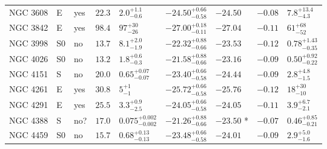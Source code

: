 \begin{table*}
\begin{center}
\begin{tabular}{lllllllll}
NGC 3608  &  E  &  yes   &  $22.3$  &  $2.0_{-0.6}^{+1.1}$   &  $-24.50_{-0.58}^{+0.66}$   &  $-24.50$   &  $-0.08$  &  $7.8_{-4.3}^{+13.4}$   \\ 
NGC 3842  &  E  &  yes   &  $98.4$  &  $97_{-26}^{+30}$   &  $-27.00_{-0.11}^{+0.18}$   &  $-27.04$   &  $-0.11$  &  $61_{-52}^{+68}$   \\ 
NGC 3998  &  S0  &  no   &  $13.7$  &  $8.1_{-1.9}^{+2.0}$   &  $-22.32_{-0.66}^{+0.88}$   &  $-23.53$   &  $-0.12$  &  $0.78_{-0.35}^{+1.43}$   \\ 
NGC 4026  &  S0  &  no   &  $13.2$  &  $1.8_{-0.3}^{+0.6}$   &  $-21.58_{-0.66}^{+0.88}$   &  $-23.16$   &  $-0.09$  &  $0.50_{-0.22}^{+0.92}$   \\ 
NGC 4151  &  S  &  no   &  $20.0$  &  $0.65_{-0.07}^{+0.07}$   &  $-23.40_{-0.58}^{+0.66}$   &  $-24.44$   &  $-0.09$  &  $2.8_{-1.5}^{+4.8}$   \\ 
NGC 4261  &  E  &  yes   &  $30.8$  &  $5_{-1}^{+1}$   &  $-25.72_{-0.58}^{+0.66}$   &  $-25.76$   &  $-0.12$  &  $18_{-10}^{+30}$   \\ 
NGC 4291  &  E  &  yes   &  $25.5$  &  $3.3_{-2.5}^{+0.9}$   &  $-24.05_{-0.58}^{+0.66}$   &  $-24.05$   &  $-0.11$  &  $3.9_{-2.1}^{+6.7}$   \\ 
NGC 4388  &  S  &  no?  &  $17.0$  &  $0.075_{-0.002}^{+0.002}$   &  $-21.26_{-0.66}^{+0.88}$   &  $-23.50$  *  &  $-0.07$  &  $0.46_{-0.21}^{+0.85}$   \\ 
NGC 4459  &  S0  &  no   &  $15.7$  &  $0.68_{-0.13}^{+0.13}$   &  $-23.48_{-0.58}^{+0.66}$   &  $-24.01$   &  $-0.09$  &  $2.9_{-1.6}^{+5.0}$   \\ 
\hline         
\end{tabular}   
\label{tab:sample} 
\end{center}    
\end{table*}    

